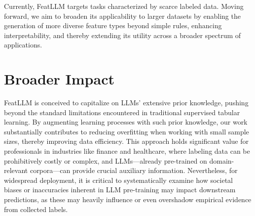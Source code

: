 Currently, \textsf{FeatLLM} targets tasks characterized by scarce labeled data. Moving forward, we aim to broaden its applicability to larger datasets by enabling the generation of more diverse feature types beyond simple rules, enhancing interpretability, and thereby extending its utility across a broader spectrum of applications.

\section{Broader Impact}
\textsf{FeatLLM} is conceived to capitalize on LLMs' extensive prior knowledge, pushing beyond the standard limitations encountered in traditional supervised tabular learning. By augmenting learning processes with such prior knowledge, our work substantially contributes to reducing overfitting when working with small sample sizes, thereby improving data efficiency. This approach holds significant value for professionals in industries like finance and healthcare, where labeling data can be prohibitively costly or complex, and LLMs—already pre-trained on domain-relevant corpora—can provide crucial auxiliary information. Nevertheless, for widespread deployment, it is critical to systematically examine how societal biases or inaccuracies inherent in LLM pre-training may impact downstream predictions, as these may heavily influence or even overshadow empirical evidence from collected labels.


